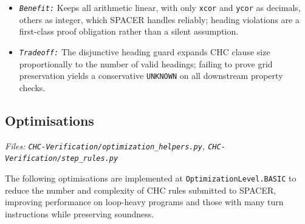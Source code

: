 \begin{enumerate}[leftmargin=1.5em, itemsep=6pt, topsep=4pt]
    \begin{itemize}[leftmargin=1.5em, noitemsep, topsep=2pt]
        \item \noindent\textit{\small \texttt{Benefit:}} Keeps all arithmetic linear, with only \texttt{xcor} and \texttt{ycor} as decimals, others as integer, which SPACER handles reliably; heading violations are a first-class proof obligation rather than a silent assumption.
        \item \noindent\textit{\small \texttt{Tradeoff:}} The disjunctive heading guard expands CHC clause size proportionally to the number of valid headings; failing to prove grid preservation yields a conservative \texttt{UNKNOWN} on all downstream property checks.
    \end{itemize}
\end{enumerate}

\subsection*{Optimisations}
\noindent\textit{\small Files: \texttt{CHC-Verification/optimization\_helpers.py}, \texttt{CHC-Verification/step\_rules.py}}

The following optimisations are implemented at \texttt{OptimizationLevel.BASIC} to reduce the number and complexity of CHC rules submitted to SPACER, improving performance on loop-heavy programs and those with many turn instructions while preserving soundness. 


